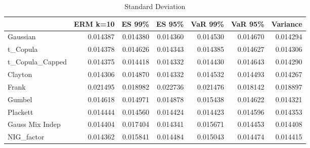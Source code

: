 \begin{table}
            \centering
\begin{tabular}{lrrrrrr}
\toprule
{} &  ERM k=10 &    ES 99\% &    ES 95\% &   VaR 99\% &   VaR 95\% &  Variance \\
\midrule
Gaussian        &  0.014387 &  \color{green}0.014380 &  0.014360 &  0.014530 &  0.014670 &  \color{blue}0.014294 \\
t\_Copula        &  0.014378 &  0.014626 &  0.014343 &  \color{green}0.014385 &  0.014627 &  \color{blue}0.014306 \\
t\_Copula\_Capped &  0.014375 &  0.014418 &  0.014332 &  0.014430 &  0.014643 &  \color{blue}0.014290 \\
Clayton         &  \color{green}0.014306 &  0.014870 &  \color{green}0.014332 &  0.014532 &  0.014493 &  \color{red}0.014267 \\
Frank           &  0.021495 &  0.018982 &  0.022736 &  0.021476 &  \color{blue}0.018142 &  0.018897 \\
Gumbel          &  0.014618 &  0.014971 &  0.014878 &  0.015438 &  0.014622 &  \color{blue}0.014321 \\
Plackett        &  0.014444 &  0.014560 &  0.014424 &  0.014423 &  0.014596 &  \color{blue}0.014353 \\
Gauss Mix Indep &  0.014404 &  0.017404 &  \color{blue}0.014341 &  0.015671 &  \color{green}0.014453 &  0.014408 \\
NIG\_factor      &  \color{blue}0.014362 &  0.015841 &  0.014484 &  0.015043 &  0.014474 &  0.014415 \\
\bottomrule
\end{tabular}
\caption{Standard Deviation}
\end{table}
\newpage
